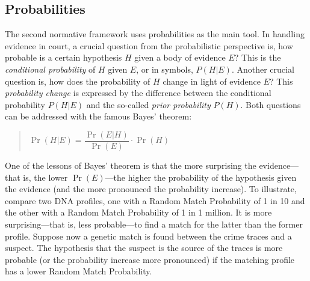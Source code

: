 \documentclass[10pt]{article}
\begin{document}
\subsection{Probabilities}
The second normative framework %
uses probabilities as the main tool. 
In handling evidence in court, a crucial question from the probabilistic perspective is, 
how probable is a certain hypothesis $H$ given a body of evidence $E$? This is 
the \textit{conditional probability} of $H$ given $E$, or in symbols, $P(H|E)$. 
Another crucial question is, how does the probability of $H$ 
change in light of evidence $E$? This \textit{probability change} is expressed by 
the difference between the conditional probability $P(H|E)$ and the so-called \textit{prior 
probability} $P(H)$.
Both questions can be addressed with 
the famous Bayes' theorem:
%
\begin{quotation}
	$\Pr(H|E) = \dfrac{\Pr(E|H)}{\Pr(E)}\cdot\Pr(H)$
\end{quotation}
%
One of the lessons of Bayes' theorem is that the more surprising 
the evidence---that is, the lower $\Pr(E)$---the higher the probability 
of the hypothesis given the evidence (and the more pronounced the probability increase). 
To illustrate, compare two DNA profiles, one with a Random Match Probability of 1 in 10 and the other with 
a Random Match Probability of 1 in 1 million. It is more surprising---that is, less probable---to find a match 
for the latter than the former profile. Suppose now a genetic match is found between 
the crime traces and a suspect. The hypothesis that the suspect is the source 
of the traces is more probable (or the probability increase more pronounced) 
if the matching profile has a lower Random Match Probability.

\end{document}
